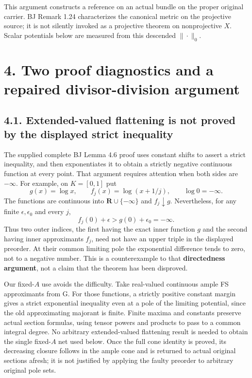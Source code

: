\documentclass[
  10pt,
]{article}
\begin{document}
This argument constructs a reference on an actual bundle on the proper
original carrier. BJ Remark 1.24 characterizes the canonical metric on
the projective source; it is not silently invoked as a projective
theorem on nonprojective \(X\). Scalar potentials below are measured
from this descended \(\|\cdot\|_0\).

\section{4. Two proof diagnostics and a repaired divisor-division
argument}\label{two-proof-diagnostics-and-a-repaired-divisor-division-argument}

\subsection{4.1. Extended-valued flattening is not proved by the
displayed strict
inequality}\label{extended-valued-flattening-is-not-proved-by-the-displayed-strict-inequality}

The supplied complete BJ Lemma 4.6 proof uses constant shifts to assert
a strict inequality, and then exponentiates it to obtain a strictly
negative continuous function at every point. That argument requires
attention when both sides are \(-\infty\). For example, on \(K=[0,1]\)
put \[
 g(x)=\log x,\qquad f_j(x)=\log(x+1/j),\qquad \log0=-\infty.
\] The functions are continuous into \(\mathbf R\cup\{-\infty\}\) and
\(f_j\downarrow g\). Nevertheless, for any finite
\(\epsilon,\epsilon_0\) and every \(j\), \[
 f_j(0)+\epsilon>g(0)+\epsilon_0=-\infty.
\] Thus two outer indices, the first having the exact inner function
\(g\) and the second having inner approximants \(f_j\), need not have an
upper triple in the displayed preorder. At their common limiting pole
the exponential difference tends to zero, not to a negative number. This
is a counterexample to that \textbf{directedness argument}, not a claim
that the theorem has been disproved.

Our fixed-\(A\) use avoids the difficulty. Take real-valued continuous
ample FS approximants from G. For those functions, a strictly positive
constant margin gives a strict exponential inequality even at a pole of
the limiting potential, since the old approximating majorant is finite.
Finite maxima and constants preserve actual section formulas, using
tensor powers and products to pass to a common integral degree. No
arbitrary extended-valued flattening result is needed to obtain the
single fixed-\(A\) net used below. Once the full cone identity is
proved, its decreasing closure follows in the ample cone and is returned
to actual original sections afresh; it is not justified by applying the
faulty preorder to arbitrary original pole sets.
\end{document}
